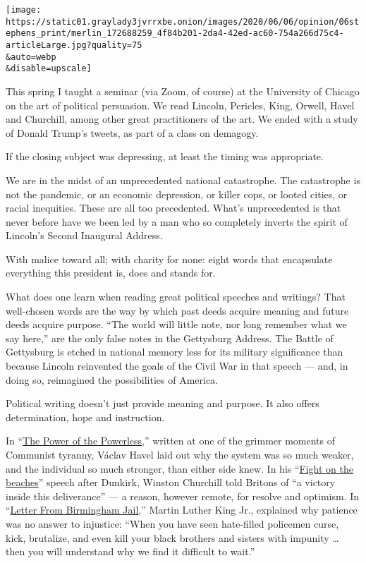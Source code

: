 \texttt{[image: https://static01.graylady3jvrrxbe.onion/images/2020/06/06/opinion/06stephens\_print/merlin\_172688259\_4f84b201-2da4-42ed-ac60-754a266d75c4-articleLarge.jpg?quality=75\\\&auto=webp\\\&disable=upscale]}

This spring I taught a seminar (via Zoom, of course) at the University
of Chicago on the art of political persuasion. We read Lincoln,
Pericles, King, Orwell, Havel and Churchill, among other great
practitioners of the art. We ended with a study of Donald Trump's
tweets, as part of a class on demagogy.

If the closing subject was depressing, at least the timing was
appropriate.

We are in the midst of an unprecedented national catastrophe. The
catastrophe is not the pandemic, or an economic depression, or killer
cops, or looted cities, or racial inequities. These are all too
precedented. What's unprecedented is that never before have we been led
by a man who so completely inverts the spirit of Lincoln's Second
Inaugural Address.

With malice toward all; with charity for none: eight words that
encapsulate everything this president is, does and stands for.

What does one learn when reading great political speeches and writings?
That well-chosen words are the way by which past deeds acquire meaning
and future deeds acquire purpose. ``The world will little note, nor long
remember what we say here,'' are the only false notes in the Gettysburg
Address. The Battle of Gettysburg is etched in national memory less for
its military significance than because Lincoln reinvented the goals of
the Civil War in that speech --- and, in doing so, reimagined the
possibilities of America.

Political writing doesn't just provide meaning and purpose. It also
offers determination, hope and instruction.

In
``\href{https://hac.bard.edu/amor-mundi/the-power-of-the-powerless-vaclav-havel-2011-12-23}{The
Power of the Powerless},'' written at one of the grimmer moments of
Communist tyranny, Václav Havel laid out why the system was so much
weaker, and the individual so much stronger, than either side knew. In
his
``\href{https://winstonchurchill.org/resources/speeches/1940-the-finest-hour/we-shall-fight-on-the-beaches/}{Fight
on the beaches}'' speech after Dunkirk, Winston Churchill told Britons
of ``a victory inside this deliverance'' --- a reason, however remote,
for resolve and optimism. In
``\href{https://www.africa.upenn.edu/Articles_Gen/Letter_Birmingham.html}{Letter
From Birmingham Jail},'' Martin Luther King Jr., explained why patience
was no answer to injustice: ``When you have seen hate-filled policemen
curse, kick, brutalize, and even kill your black brothers and sisters
with impunity \ldots{} then you will understand why we find it difficult
to wait.''

